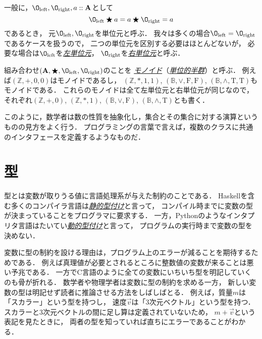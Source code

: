 \documentclass[a5paper,draft]{jsbook}
\newcommand{\programminglanguage}[1]{\textsf{#1}}
\newcommand{\clang}{\programminglanguage{C}}
\newcommand{\haskell}{\programminglanguage{Haskell}}
\newcommand{\python}{\programminglanguage{Python}}
\newcommand{\keyword}[1]{{\underline{\emph{#1}}}}
\newcommand{\mathConstant}[1]{\mathrm{#1}} %
\newcommand{\mathSub}[1]{\textrm{#1}}
\newcommand{\mathSet}[1]{\mathbf{#1}} %
\newcommand{\mathSpecialSet}[1]{\mathbb{#1}} %
\newcommand{\mathVectorVar}[1]{\vec{#1}}
\newcommand{\mathTupleWith}[1]{\left(#1\right)}
\newcommand{\mathTrue}{\mathConstant{T}}
\newcommand{\mathFalse}{\mathConstant{F}}
\newcommand{\mathId}{\O}
\newcommand{\mathLeft}{\mathSub{left}}
\newcommand{\mathRight}{\mathSub{right}}
\newcommand{\mathAnyBinaryOperator}{\mathbin{\bigstar}}
\newcommand{\mathIn}{\mathrel{::}}
\begin{document}
一般に，$\mathId_\mathLeft,\mathId_\mathRight,a\mathIn\mathSet{A}$として
\begin{equation}
\label{eq:identity}
\mathId_\mathLeft\mathAnyBinaryOperator a=a\mathAnyBinaryOperator\mathId_\mathRight=a
\end{equation}
であるとき，
元$\mathId_\mathLeft,\mathId_\mathRight$を単位元と呼ぶ．
我々は多くの場合$\mathId_\mathLeft=\mathId_\mathRight$であるケースを扱うので，
二つの単位元を区別する必要はほとんどないが，
必要な場合は$\mathId_\mathLeft$を\keyword{左単位元}，
$\mathId_\mathRight$を\keyword{右単位元}と呼ぶ．

組み合わせ$\mathTupleWith{\mathSet{A},\mathAnyBinaryOperator,\mathId_\mathLeft,\mathId_\mathRight}$のことを
\keyword{モノイド}（\keyword{単位的半群}）と呼ぶ．
例えば$\mathTupleWith{\mathSpecialSet{Z},+,0,0}$はモノイドであるし，
$\mathTupleWith{\mathSpecialSet{Z},*,1,1}$,
$\mathTupleWith{\mathSpecialSet{B},\vee,\mathFalse,\mathFalse}$,
$\mathTupleWith{\mathSpecialSet{B},\wedge,\mathTrue,\mathTrue}$もモノイドである．
これらのモノイドは全て左単位元と右単位元が同じなので，
それぞれ$\mathTupleWith{\mathSpecialSet{Z},+,0}$,
$\mathTupleWith{\mathSpecialSet{Z},*,1}$,
$\mathTupleWith{\mathSpecialSet{B},\vee,\mathFalse}$,
$\mathTupleWith{\mathSpecialSet{B},\wedge,\mathTrue}$とも書く．

このように，数学者は数の性質を抽象化し，集合とその集合に対する演算というものの見方をよく行う．
プログラミングの言葉で言えば，複数のクラスに共通のインタフェースを定義するようなものだ．

\section{型}

型とは変数が取りうる値に言語処理系が与えた制約のことである．
\haskell を含む多くのコンパイラ言語は\keyword{静的型付け}と言って，
コンパイル時までに変数の型が決まっていることをプログラマに要求する．
一方，\python のようなインタプリタ言語はたいてい\keyword{動的型付け}と言って，
プログラムの実行時まで変数の型を決めない．

変数に型の制約を設ける理由は，プログラム上のエラーが減ることを期待するためである．
例えば真理値が必要とされるところに整数値の変数が来ることは悪い予兆である．
一方で\clang 言語のように全ての変数にいちいち型を明記していくのも骨が折れる．
数学者や物理学者は変数に型の制約を求める一方，
新しい変数の型は明記せず読者に推論させる方法をしばしばとる．
例えば，質量$m$は「スカラー」という型を持つし，
速度$\mathVectorVar{v}$は「3次元ベクトル」という型を持つ．
スカラーと3次元ベクトルの間に足し算は定義されていないため，
$m+\mathVectorVar{v}$という表記を見たときに，
両者の型を知っていれば直ちにエラーであることがわかる．
\end{document}
